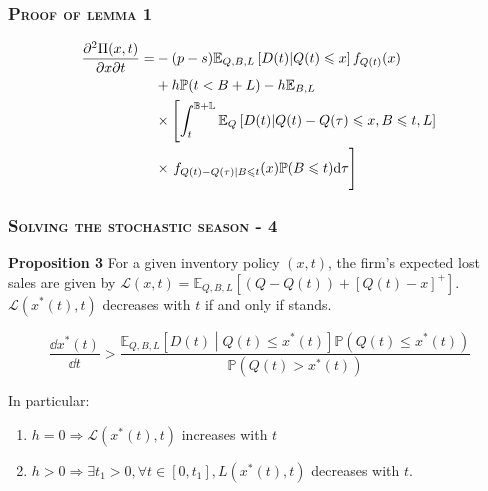 \documentclass[aspectratio=169]{../presentation}
\begin{document}
    \begin{frame}
        \frametitle{\textsc{Proof of lemma 1}}

        \begin{equation}
            \begin{aligned}
                \frac{\partial ^2\Pi(x, t)}{\partial x\partial t} =
                & -(p-s)\mathbb E_{Q, B, L}\left[D(t)|Q(t)\leq x\right]f_{Q(t)}(x) \\
                & + h\mathbb P(t < B + L) - h\mathbb E_{B, L} \\
                & \times \left[\int_{t}^\mathbb{B+L}\mathbb E_Q\left[D(t)|Q(t) - Q(\tau)\leq x, B\leq t, L\right]\right. \\
                & \times \left.\vphantom{\int_t^{B+L}} f_{Q(t) - Q(\tau) | B\leq t}(x)\mathbb P(B\leq t)\dd \tau\right]
            \end{aligned}
        \end{equation}

    \end{frame}

    \begin{frame}
        \frametitle{\textsc{Solving the stochastic season - 4}}

        \textrm{\bfseries Proposition 3} For a given inventory policy $(x, t)$, the firm's expected lost sales are given by $\mathcal L(x, t) = \mathbb E_{Q, B, L}\left[(Q - Q(t)) + \left[Q(t) - x\right]^+\right]$. $\mathcal L\left(x^*(t), t\right)$ decreases with $t$ if and only if  stands.

        \begin{equation}
            \frac{\dd x^*(t)}{\dd t} > \frac{\mathbb E_{Q, B, L}\left[D(t)\middle| Q(t)\leq x^*(t)\right]\mathbb P\left(Q(t)\leq x^*(t)\right)}{\mathbb P\left(Q(t) > x^*(t)\right)}
            \label{eq:5}
        \end{equation}

        \pause

        In particular:

        \begin{enumerate}
            \item $h = 0\Rightarrow \mathcal L\left(x^*(t), t\right)$ increases with $t$
            \item $h > 0\Rightarrow \exists t_1 > 0, \forall t\in [0, t_1], L\left(x^*(t), t\right)$ decreases with $t$.
        \end{enumerate}

    \end{frame}
\end{document}
